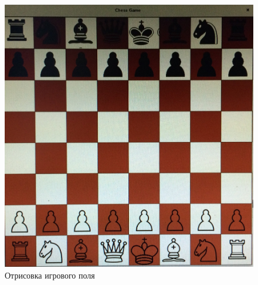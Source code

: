 \begin{figure}[H]
	\begin{center}
		\includegraphics[scale=0.1]{pics/gui3.jpg}
		\caption{Отрисовка игрового поля} 
		\label{pic:GUIgameBoard} %
	\end{center}
\end{figure}

